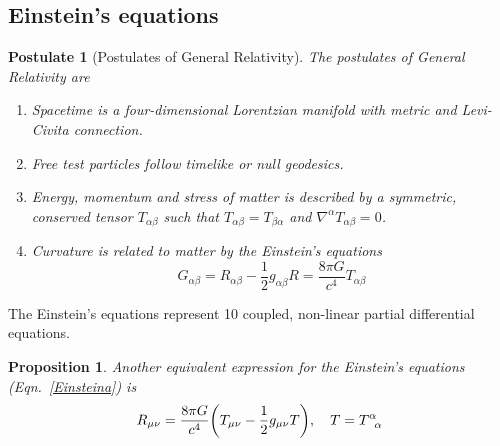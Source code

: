 \documentclass[a4paper]{article}
\newtheorem{post}{Postulate}[section]
\theoremstyle{new}
\newtheorem{prop}{Proposition}[section]
\begin{document}
\subsection{Einstein's equations}
\begin{post}[Postulates of General Relativity]
The postulates of General Relativity are
\begin{enumerate}
    \item Spacetime is a four-dimensional Lorentzian manifold with metric and Levi-Civita connection.
    \item Free test particles follow timelike or null geodesics.
    \item Energy, momentum and stress of matter is described by a symmetric, conserved tensor $T_{\alpha\beta}$ such that $T_{\alpha\beta}=T_{\beta\alpha}$ and $\nabla^\alpha T_{\alpha\beta}=0$.
    \item Curvature is related to matter by the Einstein's equations
    \begin{equation}
    G_{\alpha\beta}=R_{\alpha\beta}-\frac{1}{2}g_{\alpha\beta}R=\frac{8\pi G}{c^4} T_{\alpha\beta}\label{Einsteina}
    \end{equation}
\end{enumerate}
\end{post}
The Einstein's equations represent 10 coupled, non-linear partial differential equations.
\begin{prop}
Another equivalent expression for the Einstein's equations (Eqn.~\ref{Einsteina}) is
\begin{equation}
R_{\mu\nu}=\frac{8\pi G}{c^4}\bigg(T_{\mu\nu}-\frac{1}{2}g_{\mu\nu}T\bigg),\quad T=\tensor*{T}{*_{}^{\alpha}_{\alpha}}\label{Einsteinb}
\end{equation}
\end{prop}
\end{document}
